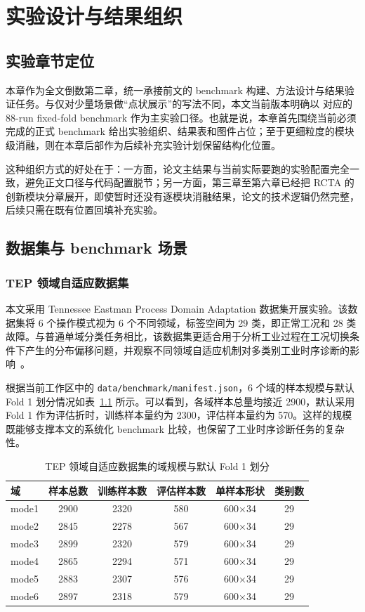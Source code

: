 \chapter{实验设计与结果组织}

\section{实验章节定位}
本章作为全文倒数第二章，统一承接前文的 benchmark 构建、方法设计与结果验证任务。与仅对少量场景做“点状展示”的写法不同，本文当前版本明确以
对应的 88-run fixed-fold benchmark 作为主实验口径。也就是说，本章首先围绕当前必须完成的正式 benchmark 给出实验组织、结果表和图件占位；至于更细粒度的模块级消融，则在本章后部作为后续补充实验计划保留结构化位置。

这种组织方式的好处在于：一方面，论文主结果与当前实际要跑的实验配置完全一致，避免正文口径与代码配置脱节；另一方面，第三章至第六章已经把 RCTA 的创新模块分章展开，即使暂时还没有逐模块消融结果，论文的技术逻辑仍然完整，后续只需在既有位置回填补充实验。

\section{数据集与 benchmark 场景}
\subsection{TEP 领域自适应数据集}
本文采用 Tennessee Eastman Process Domain Adaptation 数据集开展实验。该数据集将 6 个操作模式视为 6 个不同领域，标签空间为 29 类，即正常工况和 28 类故障。与普通单域分类任务相比，该数据集更适合用于分析工业过程在工况切换条件下产生的分布偏移问题，并观察不同领域自适应机制对多类别工业时序诊断的影响~\cite{montesuma2023benchmark}。

根据当前工作区中的 \texttt{data/benchmark/manifest.json}，6 个域的样本规模与默认 Fold 1 划分情况如表~\ref{tab:dataset-stats} 所示。可以看到，各域样本总量均接近 2900，默认采用 Fold 1 作为评估折时，训练样本量约为 2300，评估样本量约为 570。这样的规模既能够支撑本文的系统化 benchmark 比较，也保留了工业时序诊断任务的复杂性。

\begin{table}[htbp]
\centering
\caption{TEP 领域自适应数据集的域规模与默认 Fold 1 划分}
\label{tab:dataset-stats}
\begin{tabular}{lccccc}
\hline
域 & 样本总数 & 训练样本数 & 评估样本数 & 单样本形状 & 类别数 \\
\hline
mode1 & 2900 & 2320 & 580 & 600$\times$34 & 29 \\
mode2 & 2845 & 2278 & 567 & 600$\times$34 & 29 \\
mode3 & 2899 & 2320 & 579 & 600$\times$34 & 29 \\
mode4 & 2865 & 2294 & 571 & 600$\times$34 & 29 \\
mode5 & 2883 & 2307 & 576 & 600$\times$34 & 29 \\
mode6 & 2897 & 2318 & 579 & 600$\times$34 & 29 \\
\hline
\end{tabular}
\end{table}

